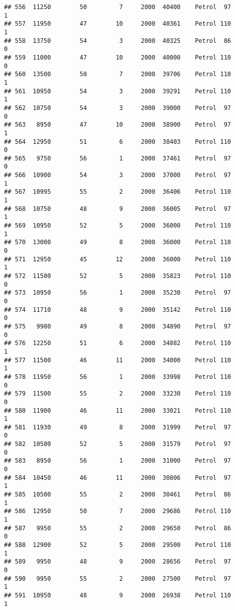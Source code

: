 \documentclass[]{article}
\begin{document}
\begin{verbatim}
## 556  11250        50         7     2000  40400    Petrol  97         1
## 557  11950        47        10     2000  40361    Petrol 110         1
## 558  13750        54         3     2000  40325    Petrol  86         0
## 559  11000        47        10     2000  40000    Petrol 110         0
## 560  13500        50         7     2000  39706    Petrol 110         1
## 561  10950        54         3     2000  39291    Petrol 110         1
## 562  10750        54         3     2000  39000    Petrol  97         0
## 563   8950        47        10     2000  38900    Petrol  97         1
## 564  12950        51         6     2000  38403    Petrol 110         0
## 565   9750        56         1     2000  37461    Petrol  97         0
## 566  10900        54         3     2000  37000    Petrol  97         1
## 567  10995        55         2     2000  36406    Petrol 110         1
## 568  10750        48         9     2000  36005    Petrol  97         1
## 569  10950        52         5     2000  36000    Petrol 110         1
## 570  13000        49         8     2000  36000    Petrol 110         0
## 571  12950        45        12     2000  36000    Petrol 110         1
## 572  11500        52         5     2000  35823    Petrol 110         0
## 573  10950        56         1     2000  35230    Petrol  97         0
## 574  11710        48         9     2000  35142    Petrol 110         0
## 575   9980        49         8     2000  34890    Petrol  97         0
## 576  12250        51         6     2000  34882    Petrol 110         1
## 577  11500        46        11     2000  34000    Petrol 110         1
## 578  11950        56         1     2000  33998    Petrol 110         0
## 579  11500        55         2     2000  33230    Petrol 110         0
## 580  11900        46        11     2000  33021    Petrol 110         1
## 581  11930        49         8     2000  31999    Petrol  97         0
## 582  10500        52         5     2000  31579    Petrol  97         0
## 583   8950        56         1     2000  31000    Petrol  97         0
## 584  10450        46        11     2000  30806    Petrol  97         1
## 585  10500        55         2     2000  30461    Petrol  86         1
## 586  12950        50         7     2000  29686    Petrol 110         1
## 587   9950        55         2     2000  29650    Petrol  86         0
## 588  12900        52         5     2000  29500    Petrol 110         1
## 589   9950        48         9     2000  28656    Petrol  97         0
## 590   9950        55         2     2000  27500    Petrol  97         1
## 591  10950        48         9     2000  26938    Petrol 110         1

\end{verbatim}
\end{document}
